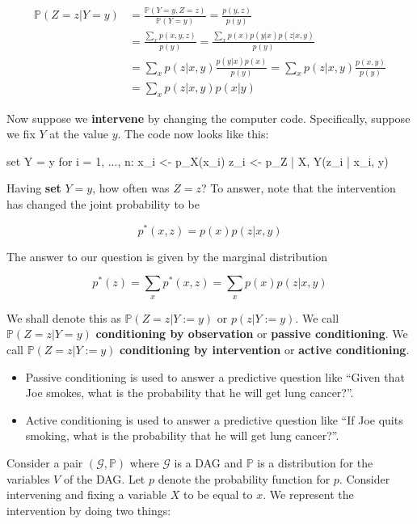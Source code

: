 \begin{align*}
\mathbb{P}(Z = z | Y = y) &= \frac{\mathbb{P}(Y = y, Z = z)}{\mathbb{P}(Y = y)} = \frac{p(y, z)}{p(y)} \\
&= \frac{\sum_x p(x, y, z)}{p(y)} = \frac{\sum_x p(x) p(y | x) p(z | x, y)}{p(y)} \\
&= \sum_x p(z | x, y) \frac{p(y | x) p(x)}{p(y)} = \sum_x p(z | x, y) \frac{p(x, y)}{p(y)} \\
&= \sum_x p(z | x, y) p(x | y)
\end{align*}

Now suppose we \textbf{intervene} by changing the computer code.
Specifically, suppose we fix \(Y\) at the value \(y\). The code now
looks like this:

\begin{console}
set Y = y
for i = 1, ..., n:
  x_{i} <- p_X(x_{i})
  z_{i} <- p_{Z | X, Y}(z_{i} | x_{i}, y)
\end{console}

Having \textbf{set} \(Y = y\), how often was \(Z = z\)? To answer, note
that the intervention has changed the joint probability to be

\[ p^*(x, z) = p(x) p(z | x, y) \]

The answer to our question is given by the marginal distribution

\[ p^*(z) = \sum_x p^*(x, z) = \sum_x p(x) p(z | x, y) \]

We shall denote this as \(\mathbb{P}(Z = z | Y := y)\) or
\(p(z | Y := y)\). We call \(\mathbb{P}(Z = z | Y = y)\)
\textbf{conditioning by observation} or \textbf{passive conditioning}.
We call \(\mathbb{P}(Z = z | Y := y)\) \textbf{conditioning by
intervention} or \textbf{active conditioning}.

\begin{itemize}[tightlist]
\item
  Passive conditioning is used to answer a predictive question like
  ``Given that Joe smokes, what is the probability that he will get lung
  cancer?''.
\item
  Active conditioning is used to answer a predictive question like ``If
  Joe quits smoking, what is the probability that he will get lung
  cancer?''.
\end{itemize}

Consider a pair \((\mathcal{G}, \mathbb{P})\) where \(\mathcal{G}\) is a
DAG and \(\mathbb{P}\) is a distribution for the variables \(V\) of the
DAG. Let \(p\) denote the probability function for \(p\). Consider
intervening and fixing a variable \(X\) to be equal to \(x\). We
represent the intervention by doing two things:

